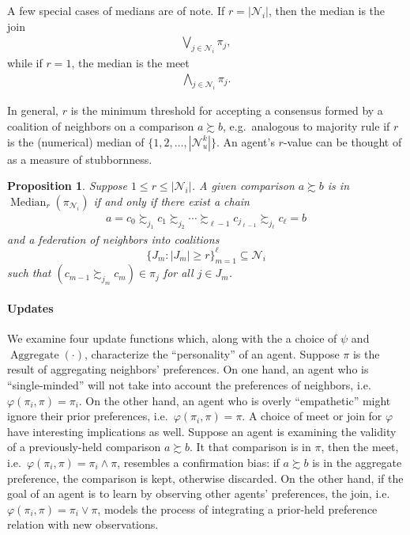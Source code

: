 \documentclass[conference]{ieeeconf}
\newcommand{\N}{\mathcal{N}}
\newcommand{\prefers}{\succsim}
\newcommand{\join}{\vee}
\newcommand{\meet}{\wedge}
\newcommand{\bigjoin}{\bigvee}
\newcommand{\bigmeet}{\bigwedge}
\renewcommand{\leq}{\leqslant}
\renewcommand{\geq}{\geqslant}
\DeclareMathOperator{\Aggregate}{Aggregate}
\DeclareMathOperator{\Median}{Median}
\newtheorem{proposition}{Proposition}
\begin{document}
A few special cases of medians are of note. If $r= |\N_i|$, then the median is the join
\begin{align*}
   \bigjoin_{j \in \N_i} \pi_j,
\end{align*}
while if $r=1$, the median is the meet
\begin{align*}
     \bigmeet_{j \in \N_i} \pi_j.
\end{align*}

In general, $r$ is the minimum threshold for accepting a consensus formed by a coalition of neighbors on a comparison $a \prefers b$, e.g.~analogous to majority rule if $r$ is the (numerical) median of $\{1,2,\dots, |\N_u^k|\}$. An agent's $r$-value can be thought of as a measure of stubbornness.

\begin{proposition}
    Suppose $1 \leq r \leq |\N_i|$. A given comparison $a \prefers b$ is in $\Median_r(\pi_{\N_i})$ if and only if there exist a chain
    \begin{align*}
        a = c_0 \prefers_{j_1} c_1 \prefers_{j_2} \cdots \prefers_{\ell-1} c_{j_{\ell-1}} \prefers_{j_\ell} c_{\ell} = b
    \end{align*}
    and a federation of neighbors into coalitions \[\{ J_m : |J_m| \geq r \}_{m=1}^{\ell} \subseteq \N_i\] such that $(c_{m-1} \prefers_{j_m} c_{m}) \in \pi_j$ for all  $j \in J_m$.
\end{proposition}

\paragraph*{Updates}
We examine four update functions which, along with the a choice of $\psi$ and $\Aggregate(\cdot)$, characterize the ``personality'' of an agent. Suppose $\pi$ is the result of aggregating neighbors' preferences. On one hand, an agent who is ``single-minded'' will not take into account the preferences of neighbors, i.e.~$\varphi(\pi_i,\pi) = \pi_i$. On the other hand, an agent who is overly ``empathetic'' might ignore their prior preferences, i.e.~$\varphi(\pi_i,\pi) = \pi$. A choice of meet or join for $\varphi$ have interesting implications as well. Suppose an agent is examining the validity of a previously-held comparison $a \prefers b$. It that comparison is in $\pi$, then the meet, i.e.~$\varphi(\pi_i,\pi) = \pi_i \meet \pi$, resembles a confirmation bias: if $a \prefers b$ is in the aggregate preference, the comparison is kept, otherwise discarded. On the other hand, if the goal of an agent is to learn by observing other agents' preferences, the join, i.e.~$\varphi(\pi_i,\pi) = \pi_i \join \pi$, models the process of integrating a prior-held preference relation with new observations.
\end{document}
